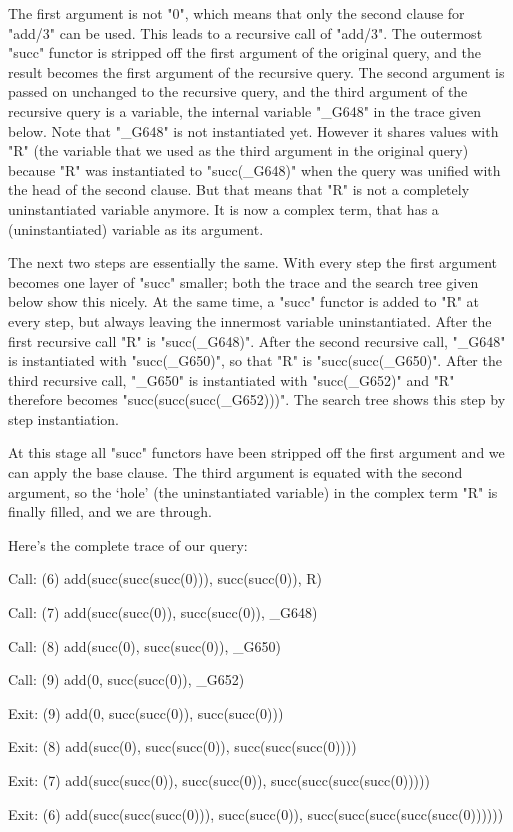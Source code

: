 The first argument is not "0", which means that only the second clause
for "add/3" can be used. This leads to a recursive call of "add/3". The
outermost "succ" functor is stripped off the first argument of the
original query, and the result becomes the first argument of the
recursive query. The second argument is passed on unchanged to the
recursive query, and the third argument of the recursive query is a
variable, the internal variable "\_G648" in the trace given below. Note
that "\_G648" is not instantiated yet. However it shares values with
"R" (the variable that we used as the third argument in the original
query) because "R" was instantiated to "succ(\_G648)" when the query
was unified with the head of the second clause. But that means that
"R" is not a completely uninstantiated variable anymore. It is now a
complex term, that has a (uninstantiated) variable as its argument.

The next two steps are essentially the same. With every step the first
argument becomes one layer of "succ" smaller; both the trace and the
search tree given below show this nicely.  At the same time, a "succ"
functor is added to "R" at every step, but always leaving
the innermost variable uninstantiated. After the first recursive
call "R" is "succ(\_G648)".  After the second recursive call, "\_G648"
is instantiated with "succ(\_G650)", so that "R" is "succ(succ(\_G650)".
After the third recursive call, "\_G650" is instantiated with
"succ(\_G652)" and "R" therefore becomes "succ(succ(succ(\_G652)))". The
search tree shows this step by step instantiation.

At this stage all "succ" functors have been stripped off the first
argument and we can apply the base clause. The third argument is
equated with the second argument, so the  `hole' (the
uninstantiated variable) in the complex term "R" is finally filled,
and we are through.

Here's the complete trace of our query:
\begin{LPNcodedisplay}
Call: (6) add(succ(succ(succ(0))), succ(succ(0)), R)

Call: (7) add(succ(succ(0)), succ(succ(0)), _G648)

Call: (8) add(succ(0), succ(succ(0)), _G650)

Call: (9) add(0, succ(succ(0)), _G652)

Exit: (9) add(0, succ(succ(0)), succ(succ(0)))

Exit: (8) add(succ(0), succ(succ(0)), succ(succ(succ(0))))

Exit: (7) add(succ(succ(0)), succ(succ(0)),
                                succ(succ(succ(succ(0)))))

Exit: (6) add(succ(succ(succ(0))), succ(succ(0)),
                          succ(succ(succ(succ(succ(0))))))
\end{LPNcodedisplay}

